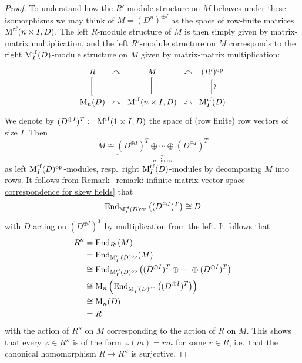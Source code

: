 \begin{proof}
  To understand how the $R'$-module structure on $M$ behaves under these isomorphisms we may think of $M = (D^n)^{\oplus I}$ as the space of row-finite matrices $\operatorname{M}^{{\operatorname{rf}}}(n \times I, D)$.
  The left $R$-module structure of $M$ is then simply given by matrix-matrix multiplication, and the left $R'$-module structure on $M$ corresponds to the right $\operatorname{M}_I^{{\operatorname{rf}}}(D)$-module structure on $M$ given by matrix-matrix multiplication:
  \[
    \begin{tikzcd}[column sep = 0em]
        R
        \arrow[equal]{d}
      &\curvearrowright
      & M
        \arrow[equal]{d}
      & \curvearrowleft
      & (R')^\op
        \arrow[equal]{d}[right]{\rotatebox[origin=c]{90}{$\sim$}}
      \\
        \Mat_n(D)
      & \curvearrowright
      & \Mat^{\rf}(n \times I, D)
      & \curvearrowleft
      & \Mat_I^{\rf}(D)
    \end{tikzcd}
  \]
  We denote by $(D^{\oplus I})^T \coloneqq \operatorname{M}^{\operatorname{rf}}(1 \times I, D)$ the space of (row finite) row vectors of size $I$.
  Then
  \[
          M
    \cong \underbrace{ (D^{\oplus I})^T \oplus \dotsb \oplus (D^{\oplus I})^T }_{\text{$n$ times}}
  \]
  as left $\operatorname{M}_I^{{\operatorname{rf}}}(D)^{\operatorname{op}}$-modules, resp.\ right $\operatorname{M}_I^{{\operatorname{rf}}}(D)$-modules by decomposing $M$ into rows.
  It follows from Remark~\ref{remark: infinite matrix vector space correspondence for skew fields} that
  \[
          \operatorname{End}_{ \operatorname{M}_I^{{\operatorname{rf}}}(D)^{\operatorname{op}} }\left( (D^{\oplus I})^T \right) 
    \cong D
  \]
  with $D$ acting on $(D^{\oplus I})^T$ by multiplication from the left.
  It follows that
  \begin{align*}
            R''
    &=      \operatorname{End}_{R'}(M)  \\
    &=      \operatorname{End}_{ \operatorname{M}_I^{{\operatorname{rf}}}(D)^{\operatorname{op}} }( M )   \\
    &\cong  \operatorname{End}_{ \operatorname{M}_I^{{\operatorname{rf}}}(D)^{\operatorname{op}} }\left( (D^{\oplus I})^T \oplus \dotsb \oplus (D^{\oplus I})^T \right) \\
    &\cong  \operatorname{M}_n\left( \operatorname{End}_{ \operatorname{M}_I^{{\operatorname{rf}}}(D)^{\operatorname{op}} }\left( (D^{\oplus I})^T \right) \right)  \\
    &\cong  \operatorname{M}_n(D) \\
    &=      R
  \end{align*}
  with the action of $R''$ on $M$ corresponding to the action of $R$ on $M$.
  This shows that every $\varphi \in R''$ is of the form $\varphi(m) = rm$ for some $r \in R$, i.e.\ that the canonical homomorphism $R \to R''$ is surjective.

\end{proof}
